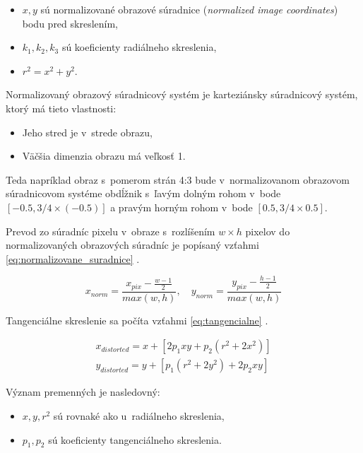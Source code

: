 \begin{itemize}
    \item $x, y$ sú normalizované obrazové súradnice (\emph{normalized image coordinates}) bodu pred skreslením,
    \item $k_1, k_2, k_3$ sú koeficienty radiálneho skreslenia,
    \item $r^2 = x^2 + y^2$.
\end{itemize}

Normalizovaný obrazový súradnicový systém je karteziánsky súradnicový systém, ktorý má tieto vlastnosti:
\begin{itemize}
    \item Jeho stred je v~strede obrazu,
    \item Väčšia dimenzia obrazu má veľkosť 1.
\end{itemize}

Teda napríklad obraz s~pomerom strán 4:3 bude v~normalizovanom obrazovom súradnicovom systéme obdĺžnik s~ľavým dolným rohom v~bode $[-0.5, 3/4 \times (-0.5)]$ a pravým horným rohom v~bode $[0.5, 3/4 \times 0.5]$.

Prevod zo súradníc pixelu v~obraze s~rozlíšením $w \times h$ pixelov do normalizovaných obrazových súradníc je popísaný vzťahmi \ref{eq:normalizovane_suradnice} \cite{opensfm_coordinate_systems}.

\begin{equation}
x_{norm} = \frac{x_{pix} - \frac{w-1}{2}}{max(w, h)}
\mathrm{,} \quad
y_{norm} = \frac{y_{pix} - \frac{h-1}{2}}{max(w, h)}
\label{eq:normalizovane_suradnice}
\end{equation}

Tangenciálne skreslenie sa počíta vzťahmi \ref{eq:tangencialne} \cite{opencv_camera_calibration}.

\begin{equation}
\begin{aligned}
x_{distorted} = x + [2 p_1 x y + p_2(r^2 + 2 x^2)] \\
y_{distorted} = y + [ p_1(r^2 + 2 y^2) + 2 p_2 x y]
\label{eq:tangencialne}
\end{aligned}
\end{equation}

Význam premenných je nasledovný:

\begin{itemize}
    \item $x, y, r^2$ sú rovnaké ako u~radiálneho skreslenia,
    \item $p_1, p_2$ sú koeficienty tangenciálneho skreslenia.
\end{itemize}

